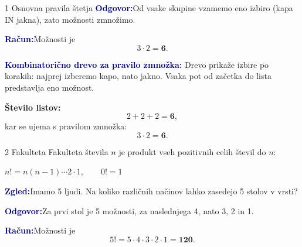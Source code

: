 \documentclass[10pt,a4paper]{article}
\newcommand{\formula}[1]{%
    \par\smallskip\noindent
    \colorbox{pale}{\parbox{\dimexpr\linewidth-2\fboxsep\relax}{\centering\(\displaystyle #1\)}}%
    \par\smallskip}
\newcommand{\zgled}{\par\smallskip\noindent\textcolor{navy}{\textbf{Zgled:}}\quad}
\newcommand{\odgovor}{\textcolor{navy}{\textbf{Odgovor:}}\quad}
\newcommand{\racun}{\par\smallskip\noindent\textcolor{navy}{\textbf{Račun:}}\quad}
\begin{document}
\begin{topicbox}{1 \enspace Osnovna pravila štetja}
\odgovor Od vsake skupine vzamemo eno izbiro (kapa IN jakna), zato možnosti zmnožimo. 
\racun Možnosti je
\[
    3\cdot2=\mathbf{6}.
\]


\par\smallskip
\smallskip

\textbf{\textcolor{navy}{Kombinatorično drevo za pravilo zmnožka:}}
Drevo prikaže izbire po korakih: najprej izberemo kapo, nato jakno.
Vsaka pot od začetka do lista predstavlja eno možnost.
\begin{center}
\end{center}
\textbf{Število listov:}
\[
    2+2+2=\mathbf{6},
\]
kar se ujema s pravilom zmnožka:
\[
    3\cdot2=\mathbf{6}.
\]
\end{topicbox}

\begin{topicbox}{2 \enspace Fakulteta}
Fakulteta števila \(n\) je produkt vseh pozitivnih celih števil do \(n\):
\formula{n!=n(n-1)\cdots2\cdot1,\qquad 0!=1}
\zgled Imamo 5 ljudi. Na koliko različnih načinov lahko zasedejo 5 stolov v vrsti?

\odgovor Za prvi stol je 5 možnosti, za naslednjega 4, nato 3, 2 in 1.
\racun Možnosti je
\[
    5!=5\cdot4\cdot3\cdot2\cdot1=\mathbf{120}.
\]

\end{topicbox}
\end{document}
